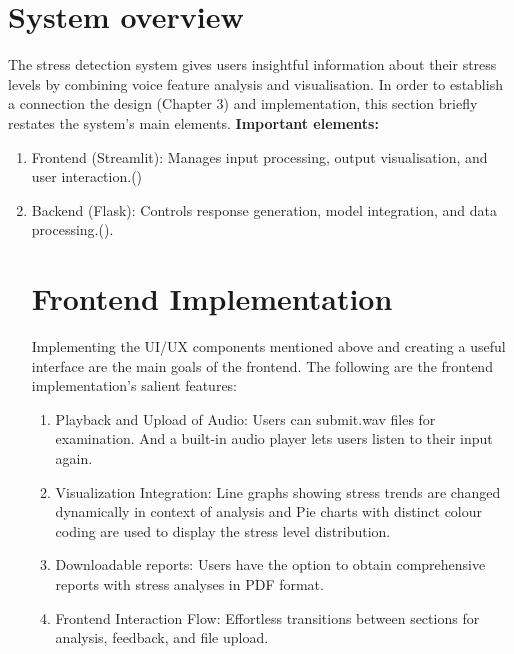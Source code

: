 \documentclass[Arial,12pt,openright,twoside]{book}
\begin{document}
 \section{System overview}
 The stress detection system gives users insightful information about their stress levels by combining voice feature analysis and visualisation. In order to establish a connection the design (Chapter 3) and implementation, this section briefly restates the system's main elements.
\textbf{Important elements:}
\begin{enumerate}
\item Frontend (Streamlit): Manages input processing, output visualisation, and user interaction.(\cite{pillai2024})
\item  Backend (Flask): Controls response generation, model integration, and data processing.(\citet{relan2019}). 
\section{Frontend Implementation}
 Implementing the UI/UX components mentioned above and creating a useful interface are the main goals of the frontend. The following are the frontend implementation's salient features:
 \begin{enumerate}
\item Playback and Upload of Audio:
Users can submit.wav files for examination. And a built-in audio player lets users listen to their input again. 
\item  Visualization Integration: Line graphs showing stress trends are changed dynamically in context of analysis and Pie charts with distinct colour coding are used to display the stress level distribution. 
\item Downloadable reports: Users have the option to obtain comprehensive reports with stress analyses in PDF format. 
\item  Frontend Interaction Flow: Effortless transitions between sections for analysis, feedback, and file upload. 
\end{enumerate}

\end{enumerate}
\end{document}
